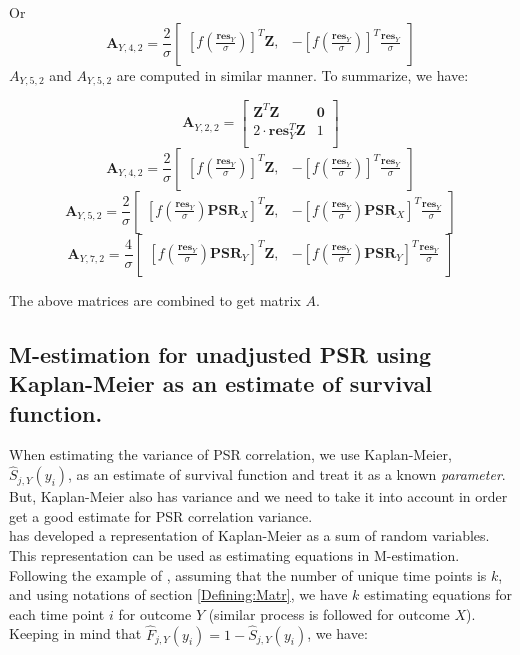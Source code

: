 \documentclass[]{article}
\begin{document}
Or
\[
\pmb{A}_{Y,4,2} = \frac{2}{\sigma}\begin{bmatrix}
   \left[f\left(\frac{\pmb{res}_Y}{\sigma}\right)\right]^T \pmb{Z}, &
   -\left[f\left(\frac{\pmb{res}_Y}{\sigma}\right)\right]^T \frac{\pmb{res}_Y}{\sigma} \\
\end{bmatrix}
\]
$A_{Y,5,2}$ and  $A_{Y,5,2}$ are computed in similar manner. To summarize, we have:

\[
\pmb{A}_{Y,2,2} = 
\begin{bmatrix}
  \pmb{Z}^T\pmb{Z} & \pmb{0}\\
  2 \cdot \pmb{res}_Y^T\pmb{Z} & 1\\
  \end{bmatrix}
\]
\[
\pmb{A}_{Y,4,2} = \frac{2}{\sigma}\begin{bmatrix}
   \left[f\left(\frac{\pmb{res}_Y}{\sigma}\right)\right]^T \pmb{Z}, &
   -\left[f\left(\frac{\pmb{res}_Y}{\sigma}\right)\right]^T \frac{\pmb{res}_Y}{\sigma} \\
\end{bmatrix}
\]
\[
\pmb{A}_{Y,5,2} = \frac{2}{\sigma}\begin{bmatrix}
   \left[f\left(\frac{\pmb{res}_Y}{\sigma}\right)\pmb{PSR}_X\right]^T \pmb{Z}, &
   -\left[f\left(\frac{\pmb{res}_Y}{\sigma}\right)\pmb{PSR}_X\right]^T \frac{\pmb{res}_Y}{\sigma} \\
\end{bmatrix}
\]
\[
\pmb{A}_{Y,7,2} = \frac{4}{\sigma}\begin{bmatrix}
   \left[f\left(\frac{\pmb{res}_Y}{\sigma}\right)\pmb{PSR}_Y\right]^T \pmb{Z}, &
   -\left[f\left(\frac{\pmb{res}_Y}{\sigma}\right)\pmb{PSR}_Y\right]^T \frac{\pmb{res}_Y}{\sigma} \\
\end{bmatrix}
\]

The above matrices are combined to get matrix $A$.


\subsection{M-estimation for unadjusted PSR using Kaplan-Meier as an estimate of survival function.}
\label{mEstForPSRUsingKM}
When estimating the variance of PSR correlation, we use Kaplan-Meier, $\hat{S}_{j,Y}(y_i)$, as an estimate of survival function and treat it as a known \emph{parameter}. But, Kaplan-Meier also has variance and we need to take it into account in order get a good estimate for PSR correlation variance.\\
\cite{stute1995central} has developed a representation of Kaplan-Meier as a sum of random variables. This representation can be used as estimating equations in M-estimation. Following the example of \cite{shepherd2007sensitivity}, assuming that the number of unique time points is $k$, and using notations of section \ref{Defining:Matr}, we have $k$ estimating equations for each time point $i$ for outcome $Y$ (similar process is followed for outcome $X$). Keeping in mind that $\hat{F}_{j,Y}(y_i) = 1-\hat{S}_{j,Y}(y_i)$, we have:
\end{document}
